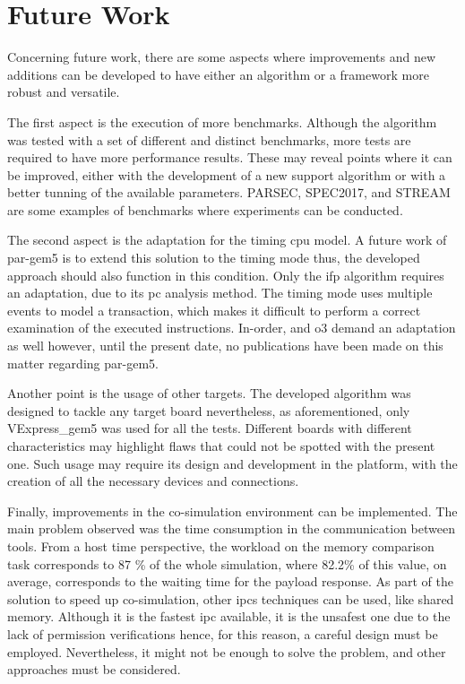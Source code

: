 \section{Future Work}

Concerning future work, there are some aspects where improvements and new additions can be developed to have either an 
algorithm or a framework more robust and versatile.

The first aspect is the execution of more benchmarks. Although the algorithm was tested with a set of different and distinct benchmarks, 
more tests are required to have more performance results. These may reveal points where it can be improved, either with the development
of a new support algorithm or with a better tunning of the available parameters. PARSEC, SPEC2017, and STREAM are some examples of 
benchmarks where experiments can be conducted. 

The second aspect is the adaptation for the timing \gls{cpu} model. A future work of par-gem5 \cite{pargem5} is to extend this solution 
to the timing mode thus, the developed approach should also function in this condition. Only the \gls{ifp} algorithm requires an 
adaptation, due to its \gls{pc} analysis method. The timing mode uses multiple events to model a transaction, which makes it difficult
to perform a correct examination of the executed instructions. In-order, and \gls{o3} demand an adaptation as well however, until 
the present date, no publications have been made on this matter regarding par-gem5.

Another point is the usage of other targets. The developed algorithm was designed to tackle any target board nevertheless, as 
aforementioned, only VExpress\_gem5 was used for all the tests. Different boards with different characteristics may highlight flaws
that could not be spotted with the present one. Such usage may require its design and development in the platform, 
with the creation of all the necessary devices and connections. 

Finally, improvements in the co-simulation environment can be implemented. The main problem observed was the time consumption in the 
communication between tools. From a host time perspective, the workload on the memory comparison task corresponds to 87 \% of the 
whole simulation, where 82.2\% of this value, on average, corresponds to the waiting time for the payload response. As part of the solution
to speed up co-simulation, other \glspl*{ipc} techniques can be used, like shared memory. Although it is the 
fastest \gls{ipc} available, it is the unsafest one due to the lack of permission verifications hence, for this reason, a careful 
design must be employed. Nevertheless, it might not be enough to solve the problem, and other approaches must be considered.

